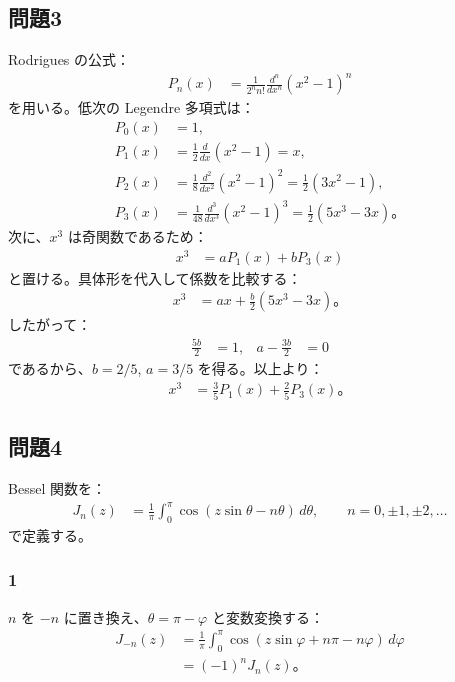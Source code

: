 \documentclass[platex,dvipdfmx,a4paper]{jsarticle}
\newcommand{\bbn}[2]{\frac{d #1}{d #2}}
\newcommand{\nbbn}[3]{\frac{d^{#1} #2}{d #3^{#1}}}
\begin{document}
\subsection*{問題3}

Rodrigues の公式：
\begin{align*}
  P_n(x)
  &=\frac{1}{2^nn!}\nbbn{n}{}{x}(x^2-1)^n
\end{align*}
を用いる。低次の Legendre 多項式は：
\begin{align*}
  P_0(x)&=1,\\
  P_1(x)&=\frac{1}{2}\bbn{}{x}(x^2-1)=x,\\
  P_2(x)&=\frac{1}{8}\nbbn{2}{}{x}(x^2-1)^2=\frac{1}{2}(3x^2-1),\\
  P_3(x)&=\frac{1}{48}\nbbn{3}{}{x}(x^2-1)^3=\frac{1}{2}(5x^3-3x)。
\end{align*}
次に、$x^3$ は奇関数であるため：
\begin{align*}
  x^3
  &=aP_1(x)+bP_3(x)
\end{align*}
と置ける。具体形を代入して係数を比較する：
\begin{align*}
  x^3
  &=ax+\frac{b}{2}(5x^3-3x)。
\end{align*}
したがって：
\begin{align*}
  \frac{5b}{2}&=1,
  &a-\frac{3b}{2}&=0
\end{align*}
であるから、$b=2/5$, $a=3/5$ を得る。以上より：
\begin{align*}
  x^3
  &=\frac{3}{5}P_1(x)+\frac{2}{5}P_3(x)。
\end{align*}

\subsection*{問題4}

Bessel 関数を：
\begin{align*}
  J_n(z)
  &=\frac{1}{\pi}\int_0^\pi\cos(z\sin\theta-n\theta)\,d\theta,
  \qquad n=0,\pm1,\pm2,\ldots
\end{align*}
で定義する。

\subsubsection*{1}

$n$ を $-n$ に置き換え、$\theta=\pi-\varphi$ と変数変換する：
\begin{align*}
  J_{-n}(z)
  &=\frac{1}{\pi}\int_0^\pi\cos(z\sin\varphi+n\pi-n\varphi)\,d\varphi \\
  &=(-1)^nJ_n(z)。
\end{align*}
\end{document}
